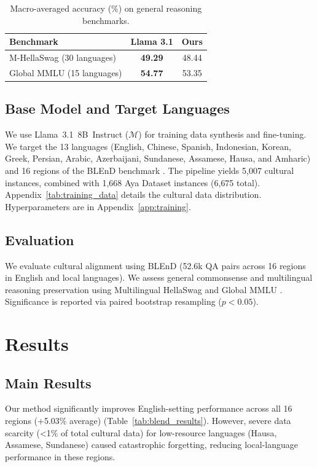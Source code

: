 \documentclass[11pt]{article}
\begin{document}
\begin{table}[t]
\centering
\small
\begin{tabular}{lcc}
\hline
\textbf{Benchmark} & \textbf{Llama 3.1} & \textbf{Ours} \\
\hline
M-HellaSwag (30 languages) & \textbf{49.29} & 48.44 \\
Global MMLU (15 languages) & \textbf{54.77} & 53.35 \\
\hline
\end{tabular}
\caption{Macro-averaged accuracy (\%) on general reasoning benchmarks.}
\label{tab:general_results}
\end{table}

\subsection{Base Model and Target Languages}
We use Llama~3.1~8B~Instruct \cite{grattafiori2024llama3herdmodels} ($\mathcal{M}$) for training data synthesis and fine-tuning. We target the 13 languages (English, Chinese, Spanish, Indonesian, Korean, Greek, Persian, Arabic, Azerbaijani, Sundanese, Assamese, Hausa, and Amharic) and 16 regions of the BLEnD benchmark \cite{myung2024blend}. The pipeline yields 5{,}007 cultural instances, combined with 1{,}668 Aya Dataset instances (6{,}675 total). Appendix~\ref{tab:training_data} details the cultural data distribution. Hyperparameters are in Appendix~\ref{app:training}.

\subsection{Evaluation}
We evaluate cultural alignment using BLEnD \cite{myung2024blend} (52.6k QA pairs across 16 regions in English and local languages). We assess general commonsense and multilingual reasoning preservation using Multilingual HellaSwag \cite{lai-etal-2023-okapi} and Global MMLU \cite{singh2024globalmmlu}. Significance is reported via paired bootstrap resampling ($p < 0.05$).

\section{Results}
\subsection{Main Results} 
Our method significantly improves English-setting performance across all 16 regions (+5.03\% average) (Table~\ref{tab:blend_results}). However, severe data scarcity (<1\% of total cultural data) for low-resource languages (Hausa, Assamese, Sundanese) caused catastrophic forgetting, reducing local-language performance in these regions. 
\end{document}
